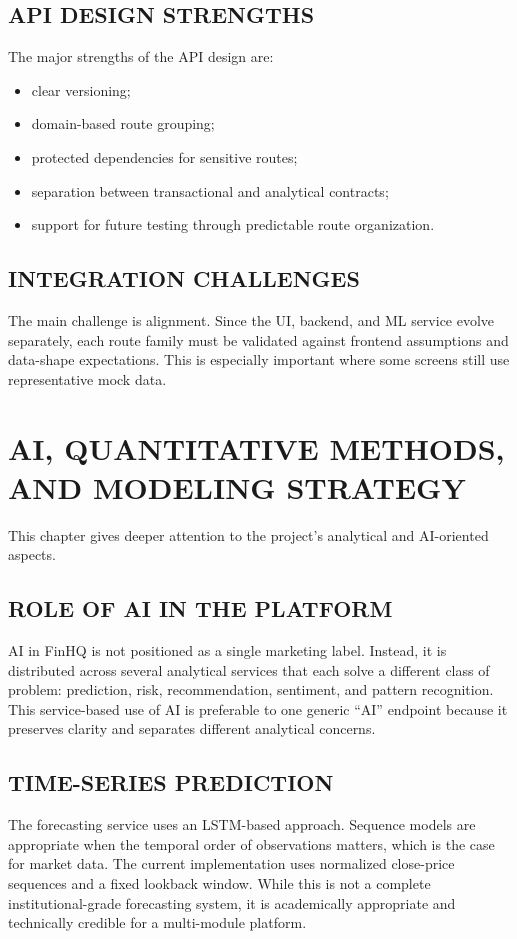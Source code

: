 \documentclass[12pt,a4paper]{report}
\newcommand{\projectshort}{FinHQ}
\begin{document}
\section{API DESIGN STRENGTHS}
The major strengths of the API design are:
\begin{itemize}
\item clear versioning;
\item domain-based route grouping;
\item protected dependencies for sensitive routes;
\item separation between transactional and analytical contracts;
\item support for future testing through predictable route organization.
\end{itemize}

\section{INTEGRATION CHALLENGES}
The main challenge is alignment. Since the UI, backend, and ML service evolve separately, each route family must be validated against frontend assumptions and data-shape expectations. This is especially important where some screens still use representative mock data.

\chapter{AI, QUANTITATIVE METHODS, AND MODELING STRATEGY}
This chapter gives deeper attention to the project's analytical and AI-oriented aspects.

\section{ROLE OF AI IN THE PLATFORM}
AI in \projectshort{} is not positioned as a single marketing label. Instead, it is distributed across several analytical services that each solve a different class of problem: prediction, risk, recommendation, sentiment, and pattern recognition. This service-based use of AI is preferable to one generic ``AI'' endpoint because it preserves clarity and separates different analytical concerns.

\section{TIME-SERIES PREDICTION}
The forecasting service uses an LSTM-based approach. Sequence models are appropriate when the temporal order of observations matters, which is the case for market data. The current implementation uses normalized close-price sequences and a fixed lookback window. While this is not a complete institutional-grade forecasting system, it is academically appropriate and technically credible for a multi-module platform.
\end{document}
